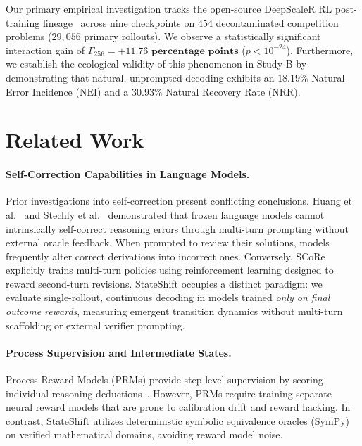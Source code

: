 \documentclass[11pt]{article}
\begin{document}
Our primary empirical investigation tracks the open-source DeepScaleR RL post-training lineage~\cite{Luo2025Deepscaler} across nine checkpoints on $454$ decontaminated competition problems ($29,056$ primary rollouts). We observe a statistically significant interaction gain of $\Gamma_{256} = \mathbf{+11.76\text{ percentage points}}$ ($p < 10^{-24}$). Furthermore, we establish the ecological validity of this phenomenon in Study B by demonstrating that natural, unprompted decoding exhibits an $18.19\%$ Natural Error Incidence ($\text{NEI}$) and a $30.93\%$ Natural Recovery Rate ($\text{NRR}$).

\section{Related Work}

\paragraph{Self-Correction Capabilities in Language Models.}
Prior investigations into self-correction present conflicting conclusions. Huang et al.~\cite{Huang2023Can} and Stechly et al.~\cite{Stechly2024Large} demonstrated that frozen language models cannot intrinsically self-correct reasoning errors through multi-turn prompting without external oracle feedback. When prompted to review their solutions, models frequently alter correct derivations into incorrect ones. Conversely, SCoRe~\cite{Kumar2024Training} explicitly trains multi-turn policies using reinforcement learning designed to reward second-turn revisions. StateShift occupies a distinct paradigm: we evaluate single-rollout, continuous decoding in models trained \emph{only on final outcome rewards}, measuring emergent transition dynamics without multi-turn scaffolding or external verifier prompting.

\paragraph{Process Supervision and Intermediate States.}
Process Reward Models (PRMs) provide step-level supervision by scoring individual reasoning deductions~\cite{Lightman2023Let, Uesato2022Solving}. However, PRMs require training separate neural reward models that are prone to calibration drift and reward hacking. In contrast, StateShift utilizes deterministic symbolic equivalence oracles (SymPy) on verified mathematical domains, avoiding reward model noise.
\end{document}
